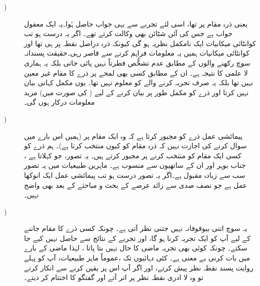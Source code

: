 \begin{description}
\item[
)   
]
   یعنی ذرہ مقام   پر تھا، اسی لئے تجربے سے یہی جواب حاصل ہُوا۔یہ ایک معقول جواب ہے جس کی آئن شٹائن بھی وکالت کرتے تھے۔ اگر یہ درست ہو تب کوانٹائی میکانیات ایک نامکمل نظریہ ہو گی کیونکہ ذرہ دراصل نقطہ  پر ہی تھا اور کوانٹائی میکانیات ہمیں یہ معلومات فراہم کرنے سے قاصر رہی۔حقیقت پسندانہ  سوچ رکھنے والوں کے مطابق عدم تشخُّص فطرتاً نہیں پائی جاتی بلکہ یہ ہماری لا علمی کا نتیجہ ہے۔ ان کے مطابق کسی بھی لمحے پر ذرے کا مقام غیر معین نہیں تھا بلکہ یہ صرف تجربہ کرنے والے کو معلوم نہیں تھا۔ یوں  مکمل کہانی بیان نہیں کرتا اور ذرے کو مکمل طور پر بیان کرنے کے لیے ( کی صورت میں) مزید معلومات درکار ہوں گی۔
\item[
)    
]
  پیمائشی عمل ذرے کو مجبور کرتا ہے کہ وہ ایک مقام پر  (ہمیں اس بارے میں سوال کرنے کی اجازت نہیں کہ ذرہ مقام  کو کیوں منتخب کرتا ہے)۔  ہم ذرے کو کسی ایک مقام کو منتخب کرنے پر مجبور کرتے ہیں۔ یہ تصور،  جو  کہلاتا ہے ، جناب بوہر اور ان کے ساتھیوں سے منسوب ہے۔ ماہرین طبیعیات میں یہ تصور سب سے زیادہ مقبول ہے۔اگر یہ تصور درست ہو تب پیمائشی عمل ایک انوکھا عمل ہے جو نصف صدی سے زائد عرصے کے بحث و  مباحثے  کے بعد بھی واضح نہیں۔ 

\item[
)     
]
 یہ سوچ اتنی بیوقوفانہ نہیں جتنی نظر آتی ہے۔ چونکہ کسی ذرے کا مقام جاننے کے لیے آپ کو ایک تجربہ کرنا ہو گا،  اور تجربے کے نتائج  سے  حاصل نہیں کیے جا سکتے۔ چونکہ کوئی بھی تجربہ ماضی کا حال نہیں بتا پاتا ، لہٰذا ماضی  کے بارے میں بات کرنی بے معنی ہے۔  کئی دہائیوں    تک ،عموماً ماہر طبیعیات،  آپ کو پہلے  روایت پسند نقطہ نظر  پیش  کرتے،  اور اگر آپ اس پر یقین کرنے سے انکار کرتے تو وہ  لا ادری نقطہ نظر پر اتر آتے اور گفتگو کا اختتام کر دیتے۔
\end{description}

